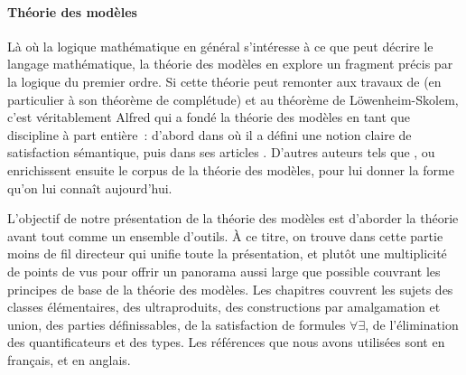 \paragraph{Théorie des modèles}
Là où la logique mathématique en général s'intéresse à ce que peut décrire le
langage mathématique, la théorie des modèles en explore un fragment précis par
la logique du premier ordre. Si cette théorie peut remonter aux travaux de
 (en particulier à son théorème de complétude) et au théorème
de Löwenheim-Skolem, c'est véritablement Alfred  qui a fondé la
théorie des modèles en tant que discipline à part entière~: d'abord dans
\cite{Tarski1935} où il a défini une notion claire de satisfaction
sémantique, puis dans ses articles \cite{Tarski1954a,Tarski1954b,Tarski1955}.
D'autres auteurs tels que ,  ou 
enrichissent ensuite le corpus de la théorie des modèles, pour lui donner la
forme qu'on lui connaît aujourd'hui.

L'objectif de notre présentation de la théorie des modèles est d'aborder la
théorie avant tout comme un ensemble d'outils. \`A ce titre, on trouve dans
cette partie moins de fil directeur qui unifie toute la présentation, et plutôt
une multiplicité de points de vus pour offrir un panorama aussi large que
possible couvrant les principes de base de la théorie des modèles. Les chapitres
couvrent les sujets des classes élémentaires, des ultraproduits, des
constructions par amalgamation et union, des parties définissables, de la
satisfaction de formules $\forall\exists$, de l'élimination des quantificateurs
et des types. Les références que nous avons utilisées sont \cite{Lascar2009}
en français, et \cite{chang1990model,marker2002model,tent2012course} en anglais.

